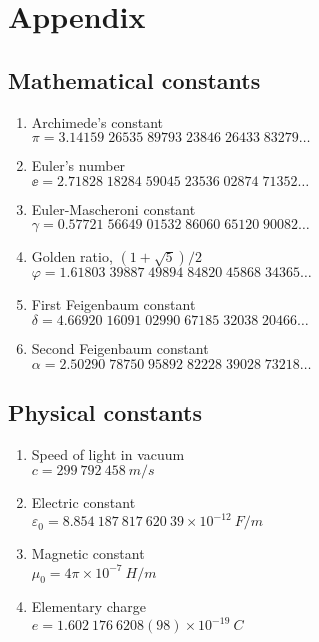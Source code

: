 
\chapter{Appendix}
\section{Mathematical constants}
\begin{enumerate}
\item Archimede's constant\\
$\pi = 3.14159\;26535\;89793\;23846\;26433\;83279\ldots$

\item Euler's number\\
$\ee = 2.71828\;18284\;59045\;23536\;02874\;71352\ldots$

\item Euler-Mascheroni constant\\
$\gamma = 0.57721\;56649\;01532\;86060\;65120\;90082\ldots$

\item Golden ratio, $(1+\sqrt{5})/2$\\
$\varphi = 1.61803\;39887\;49894\;84820\;45868\;34365\ldots$

\item First Feigenbaum constant\\
$\delta = 4.66920\;16091\;02990\;67185\;32038\;20466\ldots$

\item Second Feigenbaum constant\\
$\alpha = 2.50290\;78750\;95892\;82228\;39028\;73218\ldots$
\end{enumerate}

\section{Physical constants}

\begin{enumerate}
\item Speed of light in vacuum\\
$c=299\:792\:458\:\unit{m/s}$

\item Electric constant\\
$\varepsilon_0 = 8.854\:187\:817\:620\:39\times 10^{-12}\:\unit{F/m}$

\item Magnetic constant\\
$\mu_0 = 4\pi\times 10^{-7}\:\unit{H/m}$

\item Elementary charge\\
$e = 1.602\:176\:6208(98)\times 10^{-19}\:\unit{C}$
\end{enumerate}

